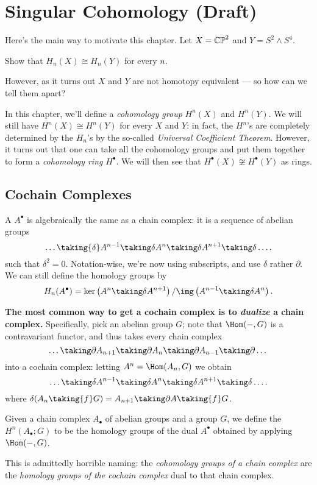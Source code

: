 \chapter{Singular Cohomology (Draft)}
Here's the main way to motivate this chapter.
Let $X = \mathbb{CP}^2$ and $Y = S^2 \wedge S^4$.
\begin{exercise}
	Show that $H_n(X) \cong H_n(Y)$ for every $n$.
\end{exercise}
However, as it turns out $X$ and $Y$ are not homotopy equivalent --- so how can we tell them apart?

In this chapter, we'll define a \emph{cohomology group} $H^n(X)$ and $H^n(Y)$.
We will still have $H^n(X) \cong H^n(Y)$ for every $X$ and $Y$:
in fact, the $H^n$'s are completely determined by the $H_n$'s
by the so-called \emph{Universal Coefficient Theorem}.
However, it turns out that one can take all the cohomology groups and put
them together to form a \emph{cohomology ring} $H^\bullet$.
We will then see that $H^\bullet(X) \not\cong H^\bullet(Y)$ as rings.

\section{Cochain Complexes}
\begin{definition}
A  $A^\bullet$ is algebraically the same as a chain complex:
it is a sequence of abelian groups
\[ \dots \taking{\delta} A^{n-1} \taking\delta A^n \taking\delta A^{n+1} \taking\delta \dots. \]
such that $\delta^2 = 0$.
Notation-wise, we're now using subscripts, and use $\delta$ rather $\partial$.
We can still define the homology groups by
\[ H_n(A^\bullet) = \ker\left( A^n \taking\delta A^{n+1} \right)
	/ \img\left( A^{n-1} \taking\delta A^n \right). \]
\end{definition}

\textbf{The most common way to get a cochain complex
is to \emph{dualize} a chain complex.}
Specifically, pick an abelian group $G$;
note that $\Hom(-, G)$ is a contravariant functor,
and thus takes every chain complex
\[ \dots \taking\partial A_{n+1} \taking\partial
	A_n \taking\partial A_{n-1} \taking\partial \dots \]
into a cochain complex: letting $A^n = \Hom(A_n, G)$ we obtain
\[ \dots \taking\delta A^{n-1} \taking\delta
	A^n \taking\delta A^{n+1} \taking\delta \dots. \]
where $\delta(A_n \taking{f} G) = A_{n+1} \taking\partial A \taking{f} G$.
\begin{definition}
	Given a chain complex $A_\bullet$ of abelian groups and a group $G$,
	we define the  $H^n(A_\bullet; G)$ to be the
	homology groups of the dual $A^\bullet$ obtained by applying $\Hom(-,G)$.
\end{definition}
This is admittedly horrible naming:
the \emph{cohomology groups of a chain complex}
are the \emph{homology groups of the cochain complex}
dual to that chain complex.

